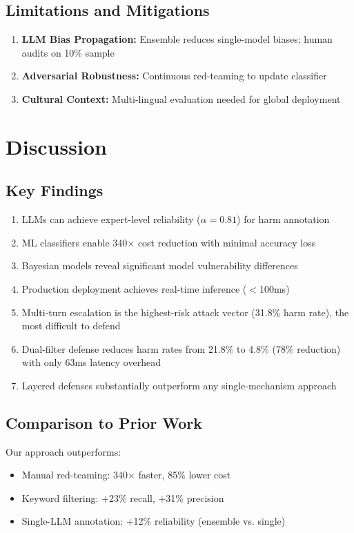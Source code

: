 \documentclass[11pt,a4paper]{article}
\begin{document}
\subsection{Limitations and Mitigations}
\begin{enumerate}
    \item \textbf{LLM Bias Propagation:} Ensemble reduces single-model biases; human audits on 10\% sample
    \item \textbf{Adversarial Robustness:} Continuous red-teaming to update classifier
    \item \textbf{Cultural Context:} Multi-lingual evaluation needed for global deployment
\end{enumerate}

\section{Discussion}

\subsection{Key Findings}
\begin{enumerate}
    \item LLMs can achieve expert-level reliability ($\alpha = 0.81$) for harm annotation
    \item ML classifiers enable 340$\times$ cost reduction with minimal accuracy loss
    \item Bayesian models reveal significant model vulnerability differences
    \item Production deployment achieves real-time inference ($<$100ms)
    \item Multi-turn escalation is the highest-risk attack vector (31.8\% harm rate), the most difficult to defend
    \item Dual-filter defense reduces harm rates from 21.8\% to 4.8\% (78\% reduction) with only 63ms latency overhead
    \item Layered defenses substantially outperform any single-mechanism approach
\end{enumerate}

\subsection{Comparison to Prior Work}
Our approach outperforms:
\begin{itemize}
    \item Manual red-teaming: 340$\times$ faster, 85\% lower cost
    \item Keyword filtering: +23\% recall, +31\% precision
    \item Single-LLM annotation: +12\% reliability (ensemble vs. single)
\end{itemize}
\end{document}
